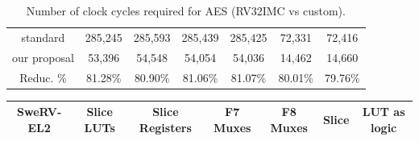 \begin{table}[tp]
\begin{tabular}{ccccccc}
    \cellcolor[HTML]{EFEFEF}standard     & 285,245              & 285,593              & 285,439              & 285,425              & 72,331               & 72,416               \\
    \cellcolor[HTML]{EFEFEF}our proposal & 53,396               & 54,548               & 54,054               & 54,036               & 14,462               & 14,660               \\
    \cellcolor[HTML]{EFEFEF}Reduc. \%    & 81.28\%                & 80.90\%                & 81.06\%                & 81.07\%                & 80.01\%                & 79.76\%               
    \end{tabular}
    \caption{Number of clock cycles required for AES (RV32IMC vs custom).}
    \label{tab:aes}
\end{table}
\begin{table}[tp]
    \begin{tabular}{ccccccc}
    \rowcolor[HTML]{C0C0C0} 
    SweRV-EL2                       & Slice LUTs           & Slice Registers      & F7 Muxes             & F8 Muxes             & Slice                          & LUT as logic                   \\ \hline

\end{tabular}
\end{table}
